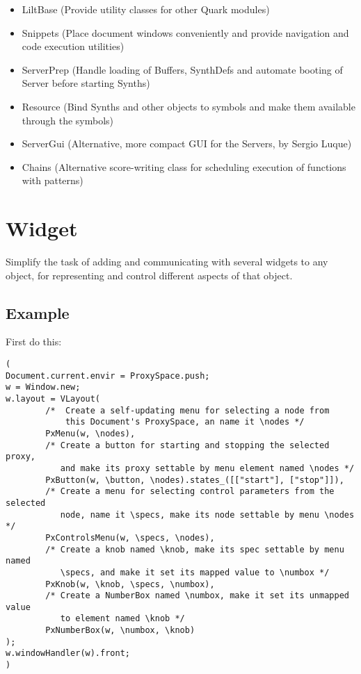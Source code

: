 \documentclass[11pt, a4paper]{scrartcl}
\begin{document}
\begin{itemize}
\item LiltBase (Provide utility classes for other Quark modules)
\item Snippets (Place document windows conveniently and provide navigation and code execution utilities)
\item ServerPrep (Handle loading of Buffers, SynthDefs and automate booting of Server before starting Synths)
\item Resource (Bind Synths and other objects to symbols and make them available through the symbols)
\item ServerGui (Alternative, more compact GUI for the Servers, by Sergio Luque)
\item Chains (Alternative score-writing class for scheduling execution of functions with patterns)
\end{itemize}
\section*{Widget}
\label{sec-5}


Simplify the task of adding and communicating with several widgets to any object, for representing and control different aspects of that object. 
\subsection*{Example}
\label{sec-5_1}


First do this: 

\begin{verbatim}
(
Document.current.envir = ProxySpace.push;
w = Window.new;
w.layout = VLayout(
        /*  Create a self-updating menu for selecting a node from 
            this Document's ProxySpace, an name it \nodes */
        PxMenu(w, \nodes),
        /* Create a button for starting and stopping the selected proxy,
           and make its proxy settable by menu element named \nodes */
        PxButton(w, \button, \nodes).states_([["start"], ["stop"]]),
        /* Create a menu for selecting control parameters from the selected
           node, name it \specs, make its node settable by menu \nodes */
        PxControlsMenu(w, \specs, \nodes),
        /* Create a knob named \knob, make its spec settable by menu named 
           \specs, and make it set its mapped value to \numbox */
        PxKnob(w, \knob, \specs, \numbox),
        /* Create a NumberBox named \numbox, make it set its unmapped value
           to element named \knob */
        PxNumberBox(w, \numbox, \knob)
);
w.windowHandler(w).front;
)
\end{verbatim}
\end{document}
